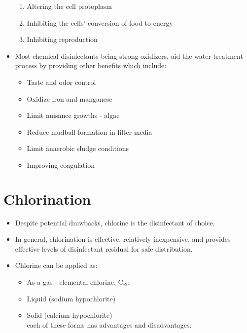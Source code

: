 \begin{itemize}
\begin{enumerate}
\item Altering the cell protoplasm
\item Inhibiting the cells’ conversion of food to energy
\item Inhibiting reproduction
\end{enumerate}
\item Most chemical disinfectants being strong oxidizers, aid the water treatment process by providing other benefits which include:  \begin{itemize}
\item Taste and odor control
\item Oxidize iron and manganese
\item Limit nuisance growths - algae 
\item Reduce mudball formation in filter media
\item Limit anaerobic sludge conditions
\item Improving coagulation
\end{itemize}

\end{itemize}

\section{Chlorination}
\begin{itemize}
\item Despite potential drawbacks, chlorine is the disinfectant of choice.
\item In general, chlorination is effective, relatively inexpensive, and provides effective levels of disinfectant residual for safe distribution. 
\item Chlorine can be applied as:
\begin{itemize}
\item As a gas - elemental chlorine, $\mathrm{Cl}_{2}$:\\
\item Liquid (sodium hypochlorite) 
\item Solid (calcium hypochlorite)\\
each of these forms has advantages and disadvantages.
\end{itemize}
\end{itemize}
